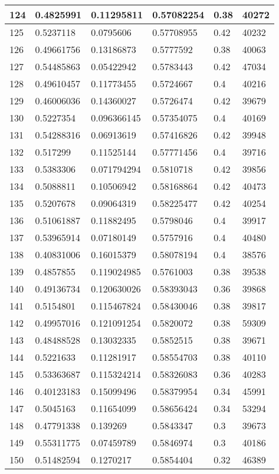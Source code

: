 \begin{longtable}{|l|l|l|l|l|l|}
124 & 0.4825991 & 0.11295811 & 0.57082254 & 0.38 & 40272 \\ \hline 
125 & 0.5237118 & 0.0795606 & 0.57708955 & 0.42 & 40232 \\ \hline 
126 & 0.49661756 & 0.13186873 & 0.5777592 & 0.38 & 40063 \\ \hline 
127 & 0.54485863 & 0.05422942 & 0.5783443 & 0.42 & 47034 \\ \hline 
128 & 0.49610457 & 0.11773455 & 0.5724667 & 0.4 & 40216 \\ \hline 
129 & 0.46006036 & 0.14360027 & 0.5726474 & 0.42 & 39679 \\ \hline 
130 & 0.5227354 & 0.096366145 & 0.57354075 & 0.4 & 40169 \\ \hline 
131 & 0.54288316 & 0.06913619 & 0.57416826 & 0.42 & 39948 \\ \hline 
132 & 0.517299 & 0.11525144 & 0.57771456 & 0.4 & 39716 \\ \hline 
133 & 0.5383306 & 0.071794294 & 0.5810718 & 0.42 & 39856 \\ \hline 
134 & 0.5088811 & 0.10506942 & 0.58168864 & 0.42 & 40473 \\ \hline 
135 & 0.5207678 & 0.09064319 & 0.58225477 & 0.42 & 40254 \\ \hline 
136 & 0.51061887 & 0.11882495 & 0.5798046 & 0.4 & 39917 \\ \hline 
137 & 0.53965914 & 0.07180149 & 0.5757916 & 0.4 & 40480 \\ \hline 
138 & 0.40831006 & 0.16015379 & 0.58078194 & 0.4 & 38576 \\ \hline 
139 & 0.4857855 & 0.119024985 & 0.5761003 & 0.38 & 39538 \\ \hline 
140 & 0.49136734 & 0.120630026 & 0.58393043 & 0.36 & 39868 \\ \hline 
141 & 0.5154801 & 0.115467824 & 0.58430046 & 0.38 & 39817 \\ \hline 
142 & 0.49957016 & 0.121091254 & 0.5820072 & 0.38 & 59309 \\ \hline 
143 & 0.48488528 & 0.13032335 & 0.5852515 & 0.38 & 39671 \\ \hline 
144 & 0.5221633 & 0.11281917 & 0.58554703 & 0.38 & 40110 \\ \hline 
145 & 0.53363687 & 0.115324214 & 0.58326083 & 0.36 & 40283 \\ \hline 
146 & 0.40123183 & 0.15099496 & 0.58379954 & 0.34 & 45991 \\ \hline 
147 & 0.5045163 & 0.11654099 & 0.58656424 & 0.34 & 53294 \\ \hline 
148 & 0.47791338 & 0.139269 & 0.5843347 & 0.3 & 39673 \\ \hline 
149 & 0.55311775 & 0.07459789 & 0.5846974 & 0.3 & 40186 \\ \hline 
150 & 0.51482594 & 0.1270217 & 0.5854404 & 0.32 & 46389 \\ \hline 
\end{longtable}